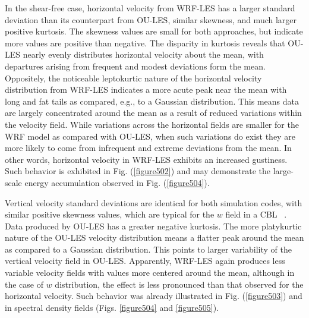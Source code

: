 In the shear-free case, horizontal velocity from WRF-LES has a larger standard deviation than its counterpart from OU-LES, similar skewness, and much larger positive kurtosis. The skewness values are small for both approaches, but indicate more values are positive than negative. The disparity in kurtosis reveals that OU-LES nearly evenly distributes horizontal velocity about the mean, with departures arising from frequent and modest deviations form the mean. Oppositely, the noticeable leptokurtic nature of the horizontal velocity distribution from WRF-LES indicates a more acute peak near the mean with long and fat tails as compared, e.g., to a Gaussian distribution. This means data are largely concentrated around the mean as a result of reduced variations within the velocity field. While variations across the horizontal fields are smaller for the WRF model as compared with OU-LES, when such variations do exist they are more likely to come from infrequent and extreme deviations from the mean. In other words, horizontal velocity in WRF-LES exhibits an increased gustiness. Such behavior is exhibited in Fig. (\autoref{figure502}) and may demonstrate the large-scale energy accumulation observed in Fig. (\autoref{figure504}).

Vertical velocity standard deviations are identical for both simulation codes, with similar positive skewness values, which are typical for the $w$ field in a CBL ~\citep{LeMone1990}. Data produced by OU-LES has a greater negative kurtosis. The more platykurtic nature of the OU-LES velocity distribution means a flatter peak around the mean as compared to a Gaussian distribution. This points to larger variability of the vertical velocity field in OU-LES. Apparently, WRF-LES again produces less variable velocity fields with values more centered around the mean, although in the case of $w$ distribution, the effect is less pronounced than that observed for the horizontal velocity. Such behavior was already illustrated in Fig. (\autoref{figure503}) and in spectral density fields (Figs. \autoref{figure504} and \autoref{figure505}).

